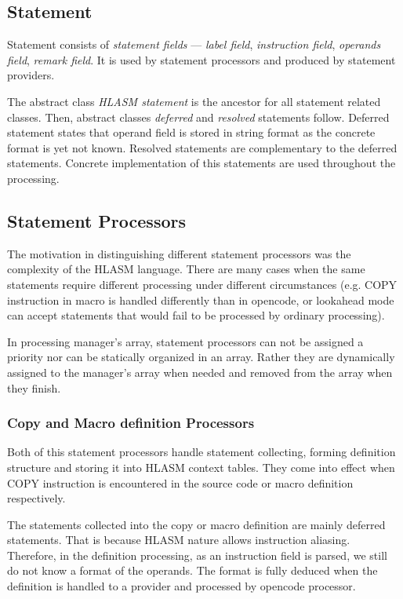 \subsection{Statement}

Statement consists of \emph{statement fields} --- \emph{label field}, \emph{instruction field}, \emph{operands field}, \emph{remark field}. It is used by statement processors and produced by statement providers. 

The abstract class \emph{HLASM statement} is the ancestor for all statement related classes. Then, abstract classes \emph{deferred} and \emph{resolved} statements follow. Deferred statement states that operand field is stored in string format as the concrete format is yet not known. Resolved statements are complementary to the deferred statements. Concrete implementation of this statements are used throughout the processing.

\subsection{Statement Processors}
\label{lab06:sect_proc}

The motivation in distinguishing different statement processors was the complexity of the HLASM language. There are many cases when the same statements require different processing under different circumstances (e.g. COPY instruction in macro is handled differently than in opencode, or lookahead mode can accept statements that would fail to be processed by ordinary processing).

In processing manager's array, statement processors can not be assigned a priority nor can be statically organized in an array. Rather they are dynamically assigned to the manager's array when needed and removed from the array when they finish.


\subsubsection{Copy and Macro definition Processors}

Both of this statement processors handle statement collecting, forming definition structure and storing it into HLASM context tables. They come into effect when COPY instruction is encountered in the source code or macro definition respectively. 

The statements collected into the copy or macro definition are mainly deferred statements. That is because HLASM nature allows instruction aliasing. Therefore, in the definition processing, as an instruction field is parsed, we still do not know a format of the operands. The format is fully deduced when the definition is handled to a provider and processed by opencode processor.


